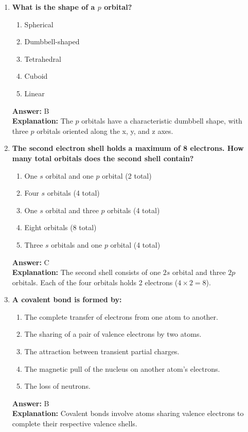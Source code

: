 \documentclass[11pt, a4paper]{article}
\begin{document}
\begin{enumerate}
\item \textbf{What is the shape of a $p$ orbital?}
\begin{enumerate}[label=\Alph*.]
    \item Spherical
    \item Dumbbell-shaped
    \item Tetrahedral
    \item Cuboid
    \item Linear
\end{enumerate}
\textbf{Answer:} B \\
\textbf{Explanation:} The $p$ orbitals have a characteristic dumbbell shape, with three $p$ orbitals oriented along the x, y, and z axes.

\item \textbf{The second electron shell holds a maximum of 8 electrons. How many total orbitals does the second shell contain?}
\begin{enumerate}[label=\Alph*.]
    \item One $s$ orbital and one $p$ orbital (2 total)
    \item Four $s$ orbitals (4 total)
    \item One $s$ orbital and three $p$ orbitals (4 total)
    \item Eight orbitals (8 total)
    \item Three $s$ orbitals and one $p$ orbital (4 total)
\end{enumerate}
\textbf{Answer:} C \\
\textbf{Explanation:} The second shell consists of one $2s$ orbital and three $2p$ orbitals. Each of the four orbitals holds 2 electrons ($4 \times 2 = 8$).


\item \textbf{A covalent bond is formed by:}
\begin{enumerate}[label=\Alph*.]
    \item The complete transfer of electrons from one atom to another.
    \item The sharing of a pair of valence electrons by two atoms.
    \item The attraction between transient partial charges.
    \item The magnetic pull of the nucleus on another atom's electrons.
    \item The loss of neutrons.
\end{enumerate}
\textbf{Answer:} B \\
\textbf{Explanation:} Covalent bonds involve atoms sharing valence electrons to complete their respective valence shells.


\end{enumerate}
\end{document}
